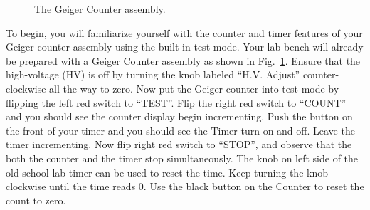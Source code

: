 \documentclass[12pt]{article}
\begin{document}
\begin{figure}[htbp]
\begin{center}
\caption{\label{fig:geigersetup} The Geiger Counter assembly.}
\end{center}
\end{figure}

To begin, you will familiarize yourself with the counter and timer
features of your Geiger counter assembly using the built-in test mode.
Your lab bench will already be prepared with a Geiger Counter assembly
as shown in Fig.~\ref{fig:geigersetup}.  Ensure that the high-voltage
(HV) is off by turning the knob labeled ``H.V. Adjust''
counter-clockwise all the way to zero.  Now put the Geiger counter
into test mode by flipping the left red switch to ``TEST''.  Flip the
right red switch to ``COUNT'' and you should see the counter display
begin incrementing.  Push the button on the front of your timer and
you should see the Timer turn on and off.  Leave the timer
incrementing.  Now flip right red switch to ``STOP'', and observe that
the both the counter and the timer stop simultaneously.  The knob on
left side of the old-school lab timer can be used to reset the time.
Keep turning the knob clockwise until the time reads 0.  Use the black
button on the Counter to reset the count to zero.
\end{document}
